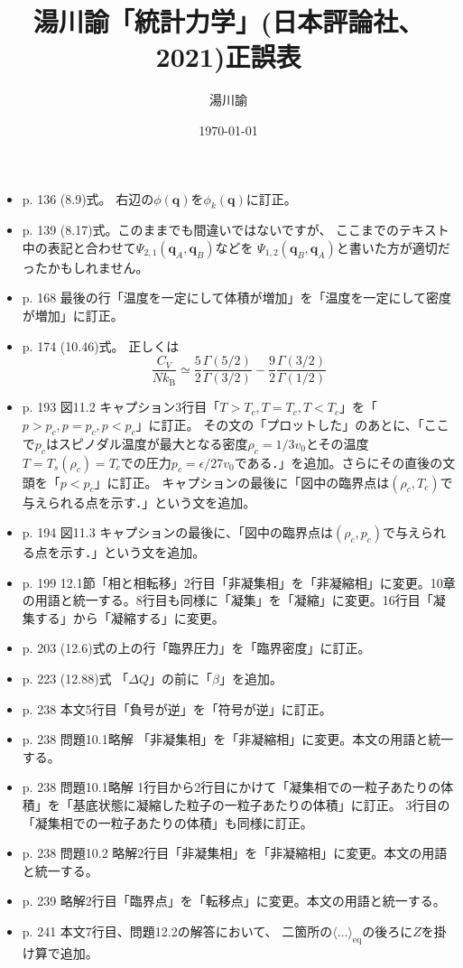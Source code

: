 \documentclass[dvipdfmx,uplatex]{jsarticle}
\begin{document}
\title{湯川諭「統計力学」(日本評論社、2021)正誤表}
\author{湯川諭}
\date{\today}
\maketitle
\begin{itemize}
\item
p. 136 (8.9)式。
右辺の$\phi(\boldsymbol{q})$を$\phi_{k}(\boldsymbol{q})$に訂正。
\item
p. 139 (8.17)式。このままでも間違いではないですが、
ここまでのテキスト中の表記と合わせて$\Psi_{2,1}(\boldsymbol{q}_{A}, \boldsymbol{q}_{B})$などを
$\Psi_{1,2}(\boldsymbol{q}_{B}, \boldsymbol{q}_{A})$と書いた方が適切だったかもしれません。
\item
p. 168 最後の行「温度を一定にして体積が増加」を「温度を一定にして密度が増加」に訂正。
\item
p. 174 (10.46)式。
正しくは
\[
 \dfrac{C_V}{N k_\mathrm{B}}\simeq
 \dfrac{5}{2} \dfrac{\Gamma(5/2)}{\Gamma(3/2)} -
 \dfrac{9}{2} \dfrac{\Gamma(3/2)}{\Gamma(1/2)}
\]
\item 
p. 193 図11.2 キャプション3行目「$T>T_{c}, T=T_{c}, T<T_{c}$」を「$p>p_{c},p=p_{c},p<p_{c}$」に訂正。
その文の「プロットした」のあとに、「ここで$p_{c}$はスピノダル温度が最大となる密度$\rho_c = 1\slash 3v_{0}$とその温度$T=T_s(\rho_{c})=T_{c}$での圧力$p_{c} = \epsilon\slash 27 v_{0}$である．」を追加。さらにその直後の文頭を「$p<p_{c}$」に訂正。
キャプションの最後に「図中の臨界点は$(\rho_{c}, T_{c})$で与えられる点を示す．」という文を追加。
\item 
p. 194 図11.3 キャプションの最後に、「図中の臨界点は$(\rho_{c}, p_{c})$で与えられる点を示す．」という文を追加。
\item
p. 199 12.1節「相と相転移」2行目「非凝集相」を「非凝縮相」に変更。10章の用語と統一する。8行目も同様に「凝集」を「凝縮」に変更。16行目「凝集する」から「凝縮する」に変更。
\item
p. 203 (12.6)式の上の行「臨界圧力」を「臨界密度」に訂正。
\item
p. 223 (12.88)式 「$\Delta Q$」の前に「$\beta$」を追加。
\item
p. 238 本文5行目「負号が逆」を「符号が逆」に訂正。
\item 
p. 238 問題10.1略解 「非凝集相」を「非凝縮相」に変更。本文の用語と統一する。
\item
p. 238 問題10.1略解 1行目から2行目にかけて「凝集相での一粒子あたりの体積」を「基底状態に凝縮した粒子の一粒子あたりの体積」に訂正。
3行目の「凝集相での一粒子あたりの体積」も同様に訂正。
\item
p. 238 問題10.2 略解2行目「非凝集相」を「非凝縮相」に変更。本文の用語と統一する。
\item
p. 239 略解2行目「臨界点」を「転移点」に変更。本文の用語と統一する。
\item
p. 241 本文7行目、問題12.2の解答において、 二箇所の$\langle \dots \rangle_{\mathrm{eq}}$の後ろに$Z$を掛け算で追加。
\end{itemize}
\end{document}
